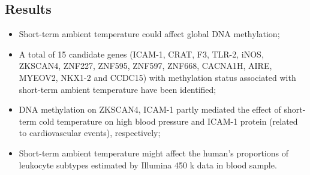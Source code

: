 \documentclass[basic]{inVerba-notes}
\begin{document}
\begin{itemize}
\subsection{Results}
\begin{itemize}
  \item Short-term ambient temperature could affect global DNA
  methylation;
  \item A total of 15 candidate genes (ICAM-1, CRAT, F3, TLR-2, iNOS,
  ZKSCAN4, ZNF227, ZNF595, ZNF597, ZNF668, CACNA1H, AIRE, MYEOV2, NKX1-2 and CCDC15) with methylation status associated with short-term ambient temperature have been identified;
  \item DNA methylation on ZKSCAN4, ICAM-1 partly mediated the effect of short-term cold temperature on high blood pressure and ICAM-1 protein (related to cardiovascular events), respectively;
  \item Short-term ambient temperature might affect the human’s
  proportions of leukocyte subtypes estimated by Illumina 450 k
  data in blood sample.
\end{itemize}


\end{itemize}
\end{document}

